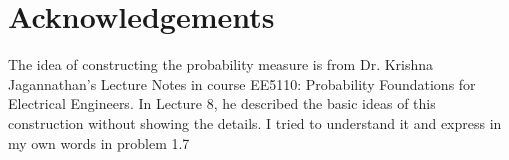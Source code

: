 \documentclass[12pt,letterpaper]{article}
\begin{document}
\section*{Acknowledgements}
The idea of constructing the probability measure is from Dr. Krishna Jagannathan's Lecture Notes in course EE5110: Probability Foundations for Electrical Engineers. In Lecture 8, he described the basic ideas of this construction without showing the details. I tried to 
understand it and express in my own words in problem 1.7
\end{document}
